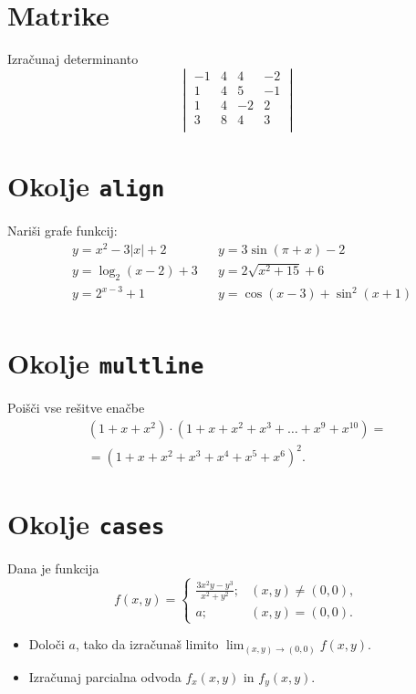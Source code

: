 \documentclass[a4paper,12pt]{article}
\begin{document}
\section*{Matrike}
Izračunaj determinanto 
$$
\begin{vmatrix}
   -1 & 4 & 4 & -2 \\
   1 & 4 & 5 & -1 \\
   1 & 4 & -2 & 2 \\
   3 & 8 & 4 & 3 \\
\end{vmatrix}
$$

 

\section*{Okolje \texttt{align}}
Nariši grafe funkcij:
\begin{align*}
& y = x^2 - 3|x| + 2   && y = 3 \sin(\pi+x) - 2\\
& y = \log_2(x-2) + 3  && y = 2 \sqrt{x^2+15} + 6\\
& y = 2^{x-3} + 1      && y = \cos(x-3) + \sin^2(x+1)\\
\end{align*}


\section*{Okolje \texttt{multline}}
Poišči vse rešitve enačbe
\begin{multline*}
  (1+x+x^2) \cdot (1+x+x^2+x^3+\ldots+x^9+x^{10}) =\\
=(1+x+x^2+x^3+x^4+x^5+x^6)^2.
\end{multline*}



\section*{Okolje \texttt{cases}}
Dana je funkcija
$$
f(x,y)=
\begin{cases}
   \frac{3x^2y-y^3}{x^2+y^2}; & (x,y)\ne(0,0),\\
   a; & (x,y)=(0,0).
\end{cases}
$$


\begin{itemize}
\item Določi \(a\), tako da izračunaš limito \( \lim_{(x,y)\to(0,0)} f(x,y) \).
\item Izračunaj parcialna odvoda \(f_x(x,y)\) in \(f_y(x,y)\).
\end{itemize}
\end{document}
